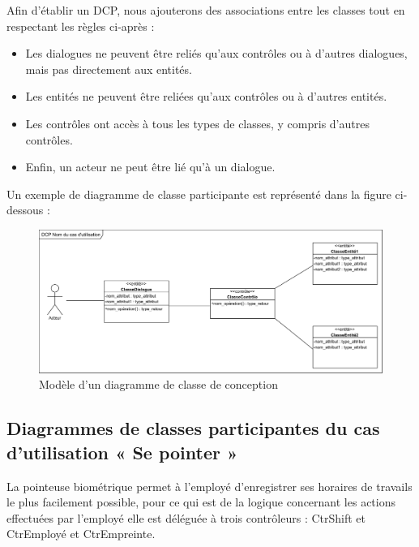         Afin d’établir un DCP, nous ajouterons des associations entre les classes tout en respectant les règles ci-après : \cite{5}
        \begin{itemize}
            \item[\textbullet] Les dialogues ne peuvent être reliés qu'aux contrôles ou à d'autres dialogues, mais pas directement aux entités.
            \item [\textbullet] Les entités ne peuvent être reliées qu'aux contrôles ou à d'autres entités.
            \item [\textbullet] Les contrôles ont accès à tous les types de classes, y compris d'autres contrôles.
            \item [\textbullet] Enfin, un acteur ne peut être lié qu'à un dialogue.
        
        \end{itemize}
        Un exemple de diagramme de classe participante est représenté dans la figure ci-dessous :        
            \begin{figure}[h!]
                 \centering
                \includegraphics[scale=0.78]{images/DCP_exemple.png}
                 \caption{Modèle d'un diagramme de classe de conception}
                 \label{fig23}
            \end{figure}
        
        \clearpage
        
          
        \subsection*{Diagrammes de classes participantes du cas d'utilisation « Se pointer »}
        La pointeuse biométrique permet à l’employé d’enregistrer ses horaires de travails le plus facilement possible, pour ce qui est de la logique concernant les actions effectuées par l’employé elle est déléguée à trois contrôleurs : CtrShift et CtrEmployé et CtrEmpreinte.
            
